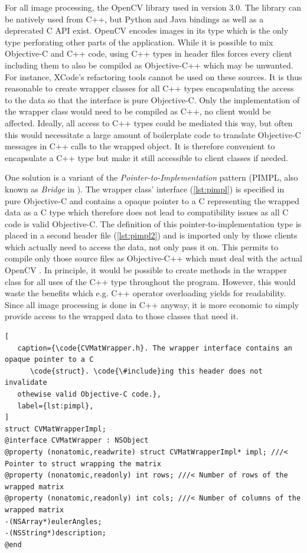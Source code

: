 For all image processing, the OpenCV library used in version 3.0. The library
can be natively used from C++, but Python and Java bindings as well as a
deprecated C API exist. OpenCV encodes images in its  type which is
the only type perforating other parts of the application. 
While it is possible to mix Objective-C and C++ code,
using C++ types in header files forces every client including them to also be
compiled as Objective-C++ which may be unwanted. For instance, XCode's
refactoring tools cannot be used on these sources. It is thus reasonable to create
wrapper classes for all C++ types encapsulating the access to the data so that
the interface is pure Objective-C. Only the implementation of the wrapper class
would need to be compiled as C++, no client would be affected. Ideally, all
access to C++ types could be mediated this way, but often this would necessitate 
a large amount of boilerplate code to translate Objective-C messages in C++
calls to the wrapped object.
It is therefore convenient to encapsulate a C++ type but make it still accessible to
client classes if needed. 

One solution is a variant of the \emph{Pointer-to-Implementation} pattern
(PIMPL, also known as \emph{Bridge} in \citep{gamma1995}). The wrapper class'
interface (\autoref{lst:pimpl}) is specified in pure Objective-C and contains a
opaque pointer to a C  representing the wrapped data as a C type
which therefore does not lead to compatibility issues as all C code is valid
Objective-C. The definition of this pointer-to-implementation type is placed in
a second header file (\autoref{lst:pimpl2}) and is imported only by those
clients which actually need to access the data, not only pass it on. This
permits to compile only those source files as Objective-C++ which must deal with
the actual OpenCV . In principle, it would be possible to create
methods in the wrapper class for all uses of the C++ type throughout the
program. However, this would waste the benefits which e.g. C++ operator
overloading yields for readability. Since all image processing is done in C++
anyway, it is more economic to simply provide access to the wrapped data to
those classes that need it.

\lstset{
   language=[Objective]C,
   float,
}

\begin{lstlisting}[
   caption={\code{CVMatWrapper.h}. The wrapper interface contains an opaque pointer to a C
      \code{struct}. \code{\#include}ing this header does not invalidate
   othewise valid Objective-C code.},
   label={lst:pimpl},
]
struct CVMatWrapperImpl;
@interface CVMatWrapper : NSObject
@property (nonatomic,readwrite) struct CVMatWrapperImpl* impl; ///< Pointer to struct wrapping the matrix
@property (nonatomic,readonly) int rows; ///< Number of rows of the wrapped matrix
@property (nonatomic,readonly) int cols; ///< Number of columns of the wrapped matrix
-(NSArray*)eulerAngles;
-(NSString*)description;
@end
\end{lstlisting}

